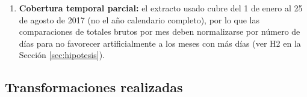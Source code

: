 \documentclass[11pt,a4paper]{article}
\begin{document}
\begin{enumerate}
    números de caso están asociados a más de un registro (2 a 4 filas),
    correspondiendo en el 100\% de los casos a homicidios con múltiples
    víctimas, lo cual debe tenerse en cuenta al contar "incidentes" versus
    "registros".
    \item \textbf{Cobertura temporal parcial:} el extracto usado cubre del
    1 de enero al 25 de agosto de 2017 (no el año calendario completo), por
    lo que las comparaciones de totales brutos por mes deben normalizarse
    por número de días para no favorecer artificialmente a los meses con
    más días (ver H2 en la Sección \ref{sec:hipotesis}).
\end{enumerate}

\subsection{Transformaciones realizadas}
\end{document}
